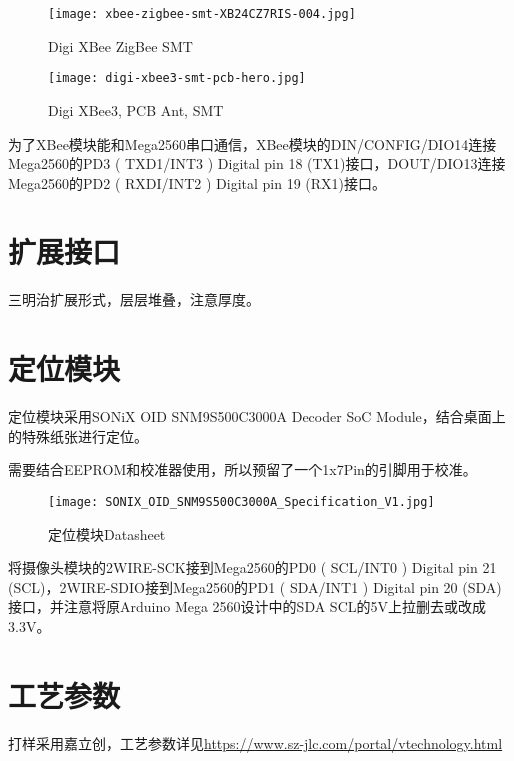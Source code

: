 \begin{figure}
    \begin{minipage}{0.48\textwidth}
      \centering
      \texttt{[image: xbee-zigbee-smt-XB24CZ7RIS-004.jpg]}
      \caption{Digi XBee ZigBee SMT}
      \label{fig:XB24CZ7RIS-004}
    \end{minipage}\hfill
    \begin{minipage}{0.48\textwidth}
      \centering
      \texttt{[image: digi-xbee3-smt-pcb-hero.jpg]}
      \caption{Digi XBee3, PCB Ant, SMT}
      \label{fig:xbee3}
    \end{minipage}
\end{figure}

为了XBee模块能和Mega2560串口通信，XBee模块的DIN/CONFIG/DIO14连接Mega2560的PD3 ( TXD1/INT3 ) Digital pin 18 (TX1)接口，DOUT/DIO13连接Mega2560的PD2 ( RXDI/INT2 ) Digital pin 19 (RX1)接口。

\section{扩展接口}

三明治扩展形式，层层堆叠，注意厚度。

\section{定位模块}

定位模块采用SONiX OID SNM9S500C3000A Decoder SoC Module，结合桌面上的特殊纸张进行定位。

需要结合EEPROM和校准器使用，所以预留了一个1x7Pin的引脚用于校准。

\begin{figure}[htbp]
    \centering
    \texttt{[image: SONIX\_OID\_SNM9S500C3000A\_Specification\_V1.jpg]}
    \caption{定位模块Datasheet}
    \label{fig:Camera}
\end{figure}

将摄像头模块的2WIRE-SCK接到Mega2560的PD0 ( SCL/INT0 ) Digital pin 21 (SCL)，2WIRE-SDIO接到Mega2560的PD1 ( SDA/INT1 ) Digital pin 20 (SDA)接口，并注意将原Arduino Mega 2560设计中的SDA SCL的5V上拉删去或改成3.3V。

\section{工艺参数}

打样采用嘉立创，工艺参数详见\url{https://www.sz-jlc.com/portal/vtechnology.html}

